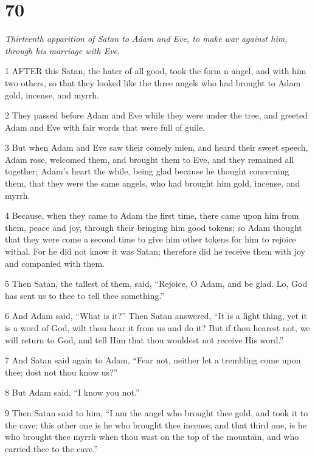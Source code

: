 \chapter{70}

\par \textit{Thirteenth apparition of Satan to Adam and Eve, to make war against him, through his marriage with Eve.}

\par 1 AFTER this Satan, the hater of all good, took the form n angel, and with him two others, so that they looked like the three angels who had brought to Adam gold, incense, and myrrh.

\par 2 They passed before Adam and Eve while they were under the tree, and greeted Adam and Eve with fair words that were full of guile.

\par 3 But when Adam and Eve saw their comely mien, and heard their sweet speech, Adam rose, welcomed them, and brought them to Eve, and they remained all together; Adam's heart the while, being glad because he thought concerning them, that they were the same angels, who had brought him gold, incense, and myrrh.

\par 4 Because, when they came to Adam the first time, there came upon him from them, peace and joy, through their bringing him good tokens; so Adam thought that they were come a second time to give him other tokens for him to rejoice withal. For he did not know it was Satan; therefore did he receive them with joy and companied with them.

\par 5 Then Satan, the tallest of them, said, “Rejoice, O Adam, and be glad. Lo, God has sent us to thee to tell thee something.”

\par 6 And Adam said, “What is it?” Then Satan answered, “It is a light thing, yet it is a word of God, wilt thou hear it from us and do it? But if thou hearest not, we will return to God, and tell Him that thou wouldest not receive His word.”

\par 7 And Satan said again to Adam, “Fear not, neither let a trembling come upon thee; dost not thou know us?”

\par 8 But Adam said, “I know you not.”

\par 9 Then Satan said to him, “I am the angel who brought thee gold, and took it to the cave; this other one is he who brought thee incense; and that third one, is he who brought thee myrrh when thou wast on the top of the mountain, and who carried thee to the cave.”

